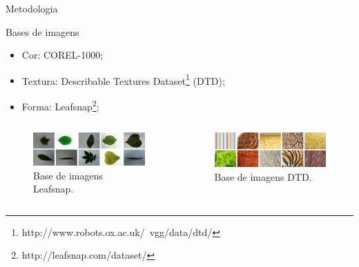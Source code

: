 \documentclass{beamer}
\begin{document}
\begin{frame}{Metodologia}
\setlength\leftmargini{1em}
\begin{block}{Bases de imagens}
\justifying
\begin{itemize}
\item Cor: COREL-1000;
\item Textura: Describable Textures Dataset\footnote{http://www.robots.ox.ac.uk/~vgg/data/dtd/} (DTD);
\item Forma: Leafsnap\footnote{http://leafsnap.com/dataset/};
\end{itemize}
\end{block}
\vspace{1em}
\begin{columns}
  \begin{column}{0.5\textwidth}
    \begin{figure}[hbpt]
      \begin{center}
        \includegraphics[width=\columnwidth]{figuras/leafs.png}
      \end{center}
      \caption{Base de imagens Leafsnap.}
    \end{figure}
    \end{column}
  \begin{column}{0.5\textwidth}
    \begin{figure}[hbpt]
      \begin{center}    
        \includegraphics[width=\columnwidth]{figuras/texture.png}
       \end{center}
      \caption{Base de imagens DTD.}
    \end{figure}
  \end{column}
\end{columns}
\end{frame}
\end{document}
